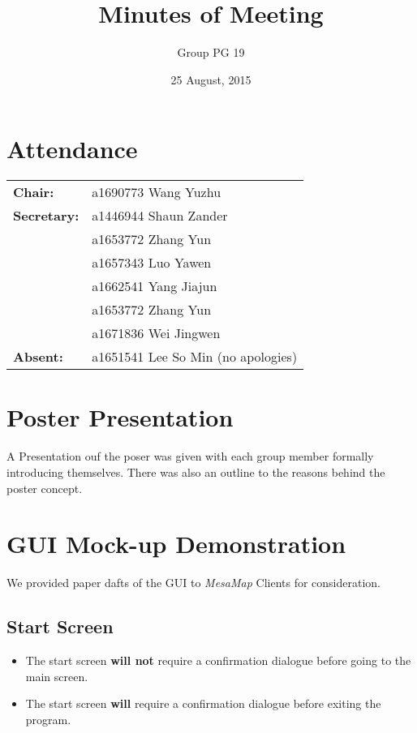\documentclass[a4paper]{article}
\title{Minutes of Meeting}
\author{Group PG 19}
\date{25 August, 2015}
\begin{document}
\maketitle
\section*{Attendance}
\begin{tabular}{l l}
\textbf{Chair:} 
&a1690773 Wang Yuzhu\\
\textbf{Secretary:}&a1446944 Shaun Zander\\
&a1653772 Zhang Yun\\
&a1657343 Luo Yawen\\
&a1662541 Yang Jiajun\\
&a1653772 Zhang Yun\\
&a1671836 Wei Jingwen\\
\textbf{Absent:}&a1651541 Lee So Min (no apologies)
\end{tabular}

\section{Poster Presentation}
A Presentation ouf the poser was given with each group member formally introducing themselves. There was also an outline to the reasons behind the poster concept.

\section{GUI Mock-up Demonstration}
We provided paper dafts of the GUI to \textit{MesaMap} Clients for consideration.

\subsection{Start Screen}
\begin{itemize}
	\item The start screen \textbf{will not} require a confirmation dialogue before going to the main screen.
	\item The start screen \textbf{will} require a confirmation dialogue before exiting the program.
\end{itemize}
\end{document}
